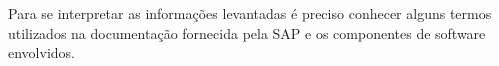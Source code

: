%
%

Para se interpretar as informações levantadas é preciso conhecer alguns termos utilizados na documentação fornecida pela SAP e os componentes de software envolvidos.

